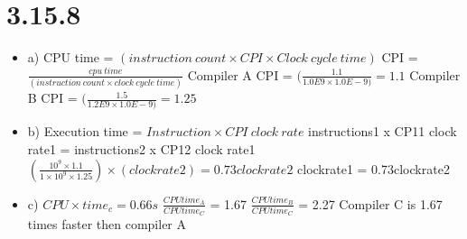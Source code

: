 \documentclass{article}
\begin{document}
\section{3.15.8}
\begin{itemize}
  \item a) CPU time = $(instruction\ count \times CPI \times Clock\ cycle\ time)$\newline
  CPI = $\frac{cpu\ time}{(instruction\ count \times clock\ cycle\ time)}$\newline
  Compiler A CPI = $(\frac{1.1}{1.0E9 \times 1.0E-9)} = 1.1$\newline 
  Compiler B CPI = $(\frac{1.5}{1.2E9 \times 1.0E-9)} = 1.25$\newline
  
  \item b) Execution time = $Instruction \times CPI\ clock\ rate$\newline
  instructions1 x CP11 clock rate1 = instructions2 x CP12 clock rate1\newline
  $(\frac{10^9 \times 1.1}{1 \times 10^9 \times 1.25}) \times (clockrate2) = 0.73clockrate2$\newline
  clockrate1 = 0.73clockrate2\newline

  \item c) $CPU \times time_c = 0.66s$\newline
  $\frac{CPUtime_A}{CPUtime_C}$ = 1.67\newline
  $\frac{CPUtime_B}{CPUtime_C}$ = 2.27\newline
  Compiler C is 1.67 times faster then compiler A\newline
\end{itemize}
\end{document}
